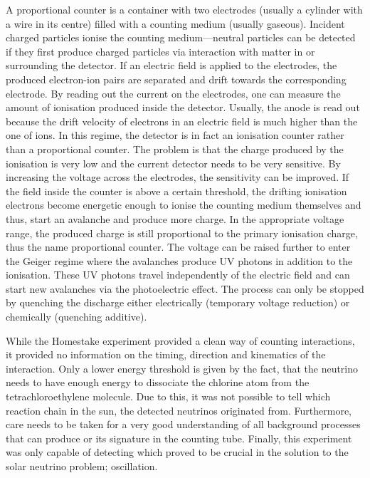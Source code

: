 A proportional counter is a container with two electrodes (usually a cylinder with a wire in its centre) filled with a counting medium (usually gaseous).
Incident charged particles ionise the counting medium---neutral particles can be detected if they first produce charged particles via interaction with matter in or surrounding the detector.
If an electric field is applied to the electrodes, the produced electron-ion pairs are separated and drift towards the corresponding electrode.
By reading out the current on the electrodes, one can measure the amount of ionisation produced inside the detector.
Usually, the anode is read out because the drift velocity of electrons in an electric field is much higher than the one of ions.
In this regime, the detector is in fact an ionisation counter rather than a proportional counter.
The problem is that the charge produced by the ionisation is very low and the current detector needs to be very sensitive.
By increasing the voltage across the electrodes, the sensitivity can be improved.
If the field inside the counter is above a certain threshold, the drifting ionisation electrons become energetic enough to ionise the counting medium themselves and thus, start an avalanche and produce more charge.
In the appropriate voltage range, the produced charge is still proportional to the primary ionisation charge, thus the name proportional counter.
The voltage can be raised further to enter the Geiger regime where the avalanches produce UV photons in addition to the ionisation.
These UV photons travel independently of the electric field and can start new avalanches via the photoelectric effect.
The process can only be stopped by quenching the discharge either electrically (temporary voltage reduction) or chemically (quenching additive).

While the Homestake experiment provided a clean way of counting \nue{} interactions, it provided no information on the timing, direction and kinematics of the interaction.
Only a lower energy threshold is given by the fact, that the neutrino needs to have enough energy to dissociate the chlorine atom from the tetrachloroethylene molecule.
Due to this, it was not possible to tell which reaction chain in the sun, the detected neutrinos originated from.
Furthermore, care needs to be taken for a very good understanding of all background processes that can produce  or its signature in the counting tube.
Finally, this experiment was only capable of detecting \nue{} which proved to be crucial in the solution to the solar neutrino problem; oscillation.


